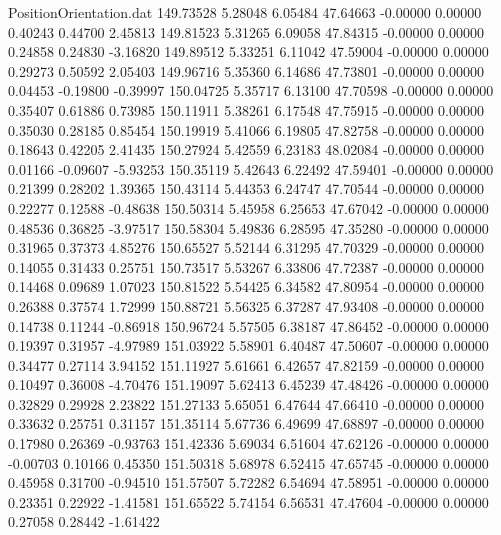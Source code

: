 \begin{filecontents}{PositionOrientation.dat}
 149.73528    5.28048    6.05484    47.64663   -0.00000    0.00000    0.40243    0.44700    2.45813
 149.81523    5.31265    6.09058    47.84315   -0.00000    0.00000    0.24858    0.24830   -3.16820
 149.89512    5.33251    6.11042    47.59004   -0.00000    0.00000    0.29273    0.50592    2.05403
 149.96716    5.35360    6.14686    47.73801   -0.00000    0.00000    0.04453   -0.19800   -0.39997
 150.04725    5.35717    6.13100    47.70598   -0.00000    0.00000    0.35407    0.61886    0.73985
 150.11911    5.38261    6.17548    47.75915   -0.00000    0.00000    0.35030    0.28185    0.85454
 150.19919    5.41066    6.19805    47.82758   -0.00000    0.00000    0.18643    0.42205    2.41435
 150.27924    5.42559    6.23183    48.02084   -0.00000    0.00000    0.01166   -0.09607   -5.93253
 150.35119    5.42643    6.22492    47.59401   -0.00000    0.00000    0.21399    0.28202    1.39365
 150.43114    5.44353    6.24747    47.70544   -0.00000    0.00000    0.22277    0.12588   -0.48638
 150.50314    5.45958    6.25653    47.67042   -0.00000    0.00000    0.48536    0.36825   -3.97517
 150.58304    5.49836    6.28595    47.35280   -0.00000    0.00000    0.31965    0.37373    4.85276
 150.65527    5.52144    6.31295    47.70329   -0.00000    0.00000    0.14055    0.31433    0.25751
 150.73517    5.53267    6.33806    47.72387   -0.00000    0.00000    0.14468    0.09689    1.07023
 150.81522    5.54425    6.34582    47.80954   -0.00000    0.00000    0.26388    0.37574    1.72999
 150.88721    5.56325    6.37287    47.93408   -0.00000    0.00000    0.14738    0.11244   -0.86918
 150.96724    5.57505    6.38187    47.86452   -0.00000    0.00000    0.19397    0.31957   -4.97989
 151.03922    5.58901    6.40487    47.50607   -0.00000    0.00000    0.34477    0.27114    3.94152
 151.11927    5.61661    6.42657    47.82159   -0.00000    0.00000    0.10497    0.36008   -4.70476
 151.19097    5.62413    6.45239    47.48426   -0.00000    0.00000    0.32829    0.29928    2.23822
 151.27133    5.65051    6.47644    47.66410   -0.00000    0.00000    0.33632    0.25751    0.31157
 151.35114    5.67736    6.49699    47.68897   -0.00000    0.00000    0.17980    0.26369   -0.93763
 151.42336    5.69034    6.51604    47.62126   -0.00000    0.00000   -0.00703    0.10166    0.45350
 151.50318    5.68978    6.52415    47.65745   -0.00000    0.00000    0.45958    0.31700   -0.94510
 151.57507    5.72282    6.54694    47.58951   -0.00000    0.00000    0.23351    0.22922   -1.41581
 151.65522    5.74154    6.56531    47.47604   -0.00000    0.00000    0.27058    0.28442   -1.61422

\end{filecontents}

